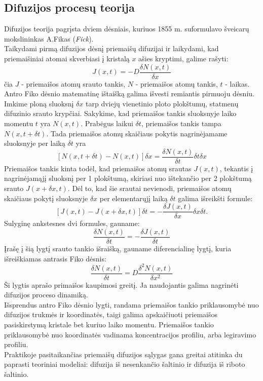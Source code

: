\documentclass[11pt,a4paper]{article}
\begin{document}
\subsection{Difuzijos procesų teorija}
Difuzijos teorija pagrįsta dviem dėsniais, kuriuos 1855 m. suformulavo šveicarų mokslininkas A.Fikas (\emph{Fick}).\\
Taikydami pirmą difuzijos dėsnį priemaišų difuzijai ir laikydami, kad priemaišiniai atomai skverbiasi į kristalą $x$ ašies kryptimi, galime rašyti:
\[ J(x,t) = - D \frac{\delta N(x,t)}{\delta x}\]
čia $J$ - priemaišos atomų srauto tankis, $N$ - priemaišos atomų tankis, $t$ - laikas.\\
Antro Fiko dėsnio matematinę ištaišką galima išvesti remiantis pirmuoju dėsniu.\\
Imkime ploną sluoksnį $\delta x$ tarp dviejų vienetinio ploto plokštumų, statmenų difuzinio srauto krypčiai. 
Sakykime, kad priemaišos tankis sluoksnyje laiko momentu $t$ yra $N(x,t)$. Prabėgus laikui $\delta t$, 
priemaišos tankis tampa $N(x,t+ \delta t)$. Tada priemaišos atomų skaičiaus pokytis nagrinėjamame sluoksnyje per laiką $\delta t$ yra
\[ [ N (x,t+\delta t ) - N(x,t) ] \delta x = \frac{\delta N(x,t)}{\delta t} \delta t \delta x\]
Priemaišos tankis kinta todėl, kad priemaišos atomų srautas $J(x,t)$, tekantis į nagrinėjamąjį sluoksnį per 1 plokštumą, 
skiriasi nuo ištekančio per 2 plokštumą srauto $J(x+\delta x,t)$. Dėl to, kad šie srautai nevienodi, 
priemaišos atomų skaičiaus pokytį sluoksnyje $\delta x$ per elementarųjį laiką $\delta t$ galima išreikšti formule:
\[ [J(x,t) - J(x + \delta x,t ) ] \delta t = - \frac{\delta J(x,t)}{\delta x} \delta x \delta t. \]
Sulyginę ankstesnes dvi formules, gauname:
\[ \frac{\delta N(x,t)}{\delta t} = - \frac{\delta J(x,t)}{\delta t} \]
Įrašę į šią lygtį srauto tankio išraišką, gauname diferencialinę lygtį, kuria išreiškiamas antrasis Fiko dėsnis:
\[ \frac{\delta N(x,t)}{\delta t} = D \frac{\delta^2 N(x,t)}{\delta x^2} \]
Ši lygtis aprašo primaišos kaupimosi greitį. Ja naudojantis galima nagrinėti difuzijos proceso dinamiką.\\
Išsprendus antro Fiko dėsnio lygti, randama priemaišos tankio priklausomybė nuo difuzijos trukmės ir koordinatės, 
taigi galima apskaičiuoti priemaišos pasiskirstymą kristale bet kuriuo laiko momentu. 
Priemaišos tankio priklausomybė nuo koordinatės vadinama koncentracijos profiliu, arba legiravimo profiliu.\\
Praktikoje pasitaikančias priemaišų difuzijos sąlygas gana greitai atitinka du paprasti teoriniai modeliai: difuzija iš nesenkančio šaltinio ir difuzija iš riboto šaltinio.\\
\end{document}
